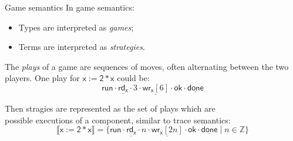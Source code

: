 \documentclass[aspectratio=141]{beamer}
\newcommand{\kw}[1]{\ensuremath{ \mathsf{#1} }}
\begin{document}
\begin{frame}{Game semantics} %
  In game semantics:
  \begin{itemize}
    \item Types are interpreted as \emph{games};
    \item Terms are interpreted as \emph{strategies}.
  \end{itemize}

  The \emph{plays} of a game are sequences of moves,
  often alternating between the two players.
  One play for $\kw{x := 2 * x}$ could be:
  \[
      \kw{run} \cdot
      \underline{\kw{rd}_\kw{x}} \cdot 3 \cdot
      \underline{\kw{wr}_\kw{x}[6]} \cdot \kw{ok} \cdot
      \underline{\kw{done}}
  \]

  Then stragies are represented as the set of plays
  which are \\ possible executions of a component,
  similar to trace semantics:
  \[
    \llbracket \kw{x := 2 * x} \rrbracket =
    \{
      \kw{run} \cdot
      \underline{\kw{rd}_\kw{x}} \cdot n \cdot
      \underline{\kw{wr}_\kw{x}[2n]} \cdot \kw{ok} \cdot
      \underline{\kw{done}}
      \mid n \in \mathbb{Z}
    \}
  \]
\end{frame}
\end{document}
